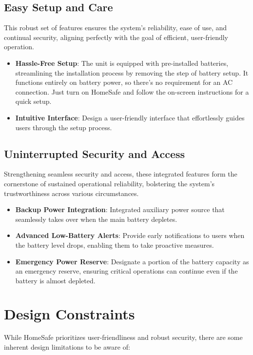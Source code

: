 \documentclass{article}
\begin{document}
\subsection{Easy Setup and Care}
This robust set of features ensures the system's reliability, ease of use, and continual security, aligning perfectly with the goal of efficient, user-friendly operation.

\begin{itemize}
    \item \textbf{Hassle-Free Setup}: The unit is equipped with pre-installed batteries, streamlining the installation process by removing the step of battery setup. It functions entirely on battery power, so there's no requirement for an AC connection. Just turn on HomeSafe and follow the on-screen instructions for a quick setup.
    \item \textbf{Intuitive Interface}: Design a user-friendly interface that effortlessly guides users through the setup process.
\end{itemize}

\subsection{Uninterrupted Security and Access}
Strengthening seamless security and access, these integrated features form the cornerstone of sustained operational reliability, bolstering the system's trustworthiness across various circumstances.

\begin{itemize}
    \item \textbf{Backup Power Integration}: Integrated auxiliary power source that seamlessly takes over when the main battery depletes.
    \item \textbf{Advanced Low-Battery Alerts}: Provide early notifications to users when the battery level drops, enabling them to take proactive measures.
    \item \textbf{Emergency Power Reserve}: Designate a portion of the battery capacity as an emergency reserve, ensuring critical operations can continue even if the battery is almost depleted.
\end{itemize}

\section{Design Constraints}
While HomeSafe prioritizes user-friendliness and robust security, there are some inherent design limitations to be aware of:
\end{document}
